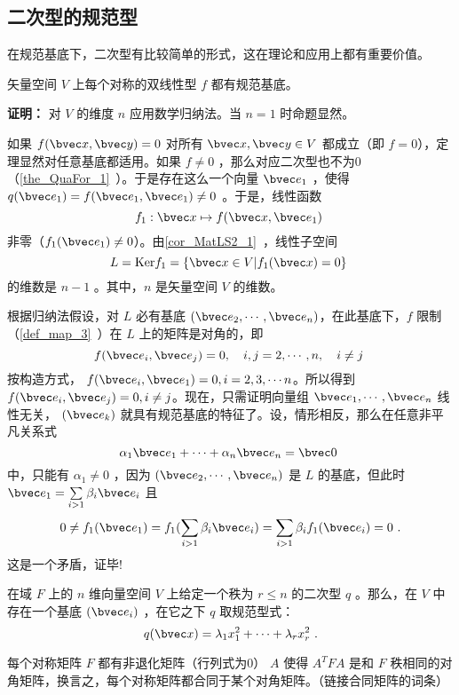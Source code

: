 
\subsection{二次型的规范型}
在规范基底下，二次型有比较简单的形式，这在理论和应用上都有重要价值。
\begin{theorem}{}\label{the_GuaOQu_1}
矢量空间 $V$ 上每个对称的双线性型 $f$ 都有规范基底。
\end{theorem}
\textbf{证明：} 对 $V$ 的维度 $n$ 应用数学归纳法。当 $n=1$ 时命题显然。

如果 $f(\bvec x,\bvec y)=0$ 对所有 $\bvec x,\bvec y\in V$ 都成立（即 $f=0$），定理显然对任意基底都适用。如果 $f\neq 0$ ，那么对应二次型也不为0（\autoref{the_QuaFor_1}~）。于是存在这么一个向量 $\bvec e_1$ ，使得 $q(\bvec e_1)=f(\bvec e_1,\bvec e_1)\neq0$ 。于是，线性函数
\begin{equation}
f_1:\bvec x\mapsto f(\bvec x,\bvec e_1)~
\end{equation}
非零（$f_1(\bvec e_1)\neq0$）。由\autoref{cor_MatLS2_1}~，线性子空间
\begin{equation}
L=\mathrm{Ker} f_1=\{\bvec x\in V|f_1(\bvec x)=0\}~
\end{equation}
的维数是 $n-1$ 。其中，$n$ 是矢量空间 $V$ 的维数。

根据归纳法假设，对 $L$ 必有基底 $(\bvec e_2,\cdots,\bvec e_n)$，在此基底下，$f$ 限制（\autoref{def_map_3}~）在 $L$ 上的矩阵是对角的，即 
\begin{equation}
f(\bvec e_i,\bvec e_j)=0,\quad i,j=2,\cdots ,n,\quad i\neq j~
\end{equation}
按构造方式， $f(\bvec e_i,\bvec e_1)=0,i=2,3,\cdots n$。所以得到 $f(\bvec e_i,\bvec e_j)=0,i\neq j$。现在，只需证明向量组 $\bvec e_1,\cdots,\bvec e_n$ 线性无关， $(\bvec e_k)$ 就具有规范基底的特征了。设，情形相反，那么在任意非平凡关系式
\begin{equation}
\alpha_1\bvec e_1+\cdots+\alpha_n\bvec e_n=\bvec 0~
\end{equation}
中，只能有 $\alpha_1\neq0$ ，因为 $(\bvec e_2,\cdots ,\bvec e_n)$ 是 $L$ 的基底，但此时 $\bvec e_1=\sum\limits_{i>1}\beta _i\bvec e_i$ 且
\begin{equation}
0\neq f_1(\bvec e_1)=f_1(\sum\limits_{i>1}\beta_i\bvec e_i)=\sum\limits_{i>1}\beta_if_1(\bvec e_i)=0~.
\end{equation}
这是一个矛盾，证毕!
\begin{corollary}{}
在域 $F$ 上的 $n$ 维向量空间 $V$ 上给定一个秩为 $r\leq n$ 的二次型 $q$ 。那么，在 $V$ 中存在一个基底 $(\bvec e_i)$ ，在它之下 $q$ 取规范型式：
\begin{equation}\label{eq_GuaOQu_1}
q(\bvec x)=\lambda_1 x_1^2+\cdots+\lambda_r x_r^2~.
\end{equation}

\end{corollary}
\begin{corollary}{}
每个对称矩阵 $F$ 都有非退化矩阵（行列式为0） $A$ 使得 $A^{T}FA$ 是和 $F$ 秩相同的对角矩阵，换言之，每个对称矩阵都合同于某个对角矩阵。（链接合同矩阵的词条） 
\end{corollary}
